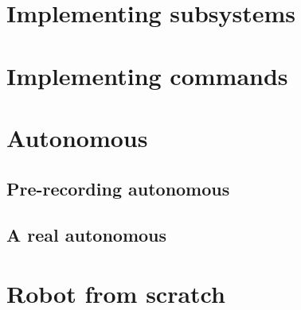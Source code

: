 \documentclass[12pt]{article}
\begin{document}
\section{Implementing subsystems}

\section{Implementing commands}\label{sec:implementing-commands}

\section{Autonomous}
\subsection{Pre-recording autonomous}
\subsection{A real autonomous}

\section{Robot from scratch}\label{sec:robot-from-scratch}
\end{document}
